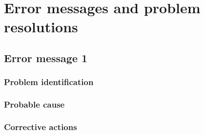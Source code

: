 
\chapter{Error messages and problem resolutions}
\label{chap:error_messages}




\section{Error message 1}

\subsection{Problem identification}

\subsection{Probable cause}

\subsection{Corrective actions}
